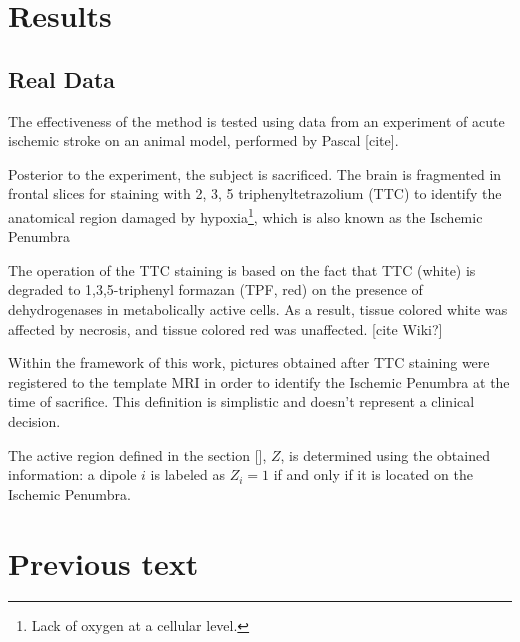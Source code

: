 \section{Results}

\subsection{Real Data}

The effectiveness of the method is tested using data from an experiment 
of acute ischemic stroke on an animal model, performed by
Pascal [cite].

Posterior to the experiment, the subject is sacrificed.
%
The brain is fragmented in frontal slices for staining with
2, 3, 5 
triphenyltetrazolium (TTC)
to identify the anatomical region damaged by hypoxia\footnote{Lack of oxygen at a cellular level.}, which is also known as the Ischemic Penumbra

The operation of the TTC staining is based on the fact that TTC (white) 
is degraded to 1,3,5-triphenyl formazan (TPF, red)
on the presence of dehydrogenases in metabolically active cells.
%
As a result, tissue colored white was affected by necrosis, and tissue colored red was unaffected. 
[cite Wiki?]


Within the framework of this work, pictures obtained after TTC staining were registered to the template MRI in order to identify the Ischemic Penumbra at the time of sacrifice.
%
This definition is simplistic and doesn't represent a clinical decision.

The active region defined in the section [], $Z$, is determined using the obtained information: a dipole $i$ is labeled as $Z_i=1$ if and only if it is located on the Ischemic Penumbra.



\section{Previous text}





 



 




 


